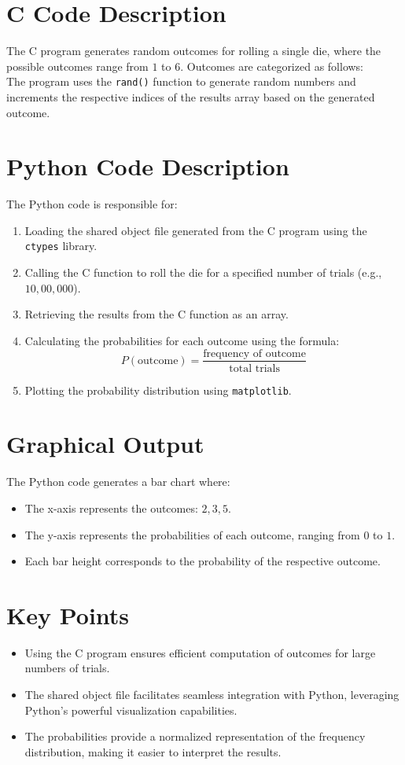 \documentclass[journal]{IEEEtran}
\begin{document}
\section*{C Code Description}
The C program generates random outcomes for rolling a single die, where the possible outcomes range from \(1\) to \(6\). Outcomes are categorized as follows:\\
The program uses the \texttt{rand()} function to generate random numbers and increments the respective indices of the results array based on the generated outcome.\\
\section*{Python Code Description}
The Python code is responsible for:
\begin{enumerate}
    \item Loading the shared object file generated from the C program using the \texttt{ctypes} library.
    \item Calling the C function to roll the die for a specified number of trials (e.g., \(10,00,000\)).
    \item Retrieving the results from the C function as an array.
    \item Calculating the probabilities for each outcome using the formula:
    \[
    P(\text{outcome}) = \frac{\text{frequency of outcome}}{\text{total trials}}
    \]
    \item Plotting the probability distribution using \texttt{matplotlib}.
\end{enumerate}
\section*{Graphical Output}
The Python code generates a bar chart where:
\begin{itemize}
    \item The x-axis represents the outcomes: \(2,3,5\).
    \item The y-axis represents the probabilities of each outcome, ranging from \(0\) to \(1\).
    \item Each bar height corresponds to the probability of the respective outcome.
\end{itemize}
\section*{Key Points}
\begin{itemize}
    \item Using the C program ensures efficient computation of outcomes for large numbers of trials.
    \item The shared object file facilitates seamless integration with Python, leveraging Python's powerful visualization capabilities.
    \item The probabilities provide a normalized representation of the frequency distribution, making it easier to interpret the results.
\end{itemize}
\end{document}
